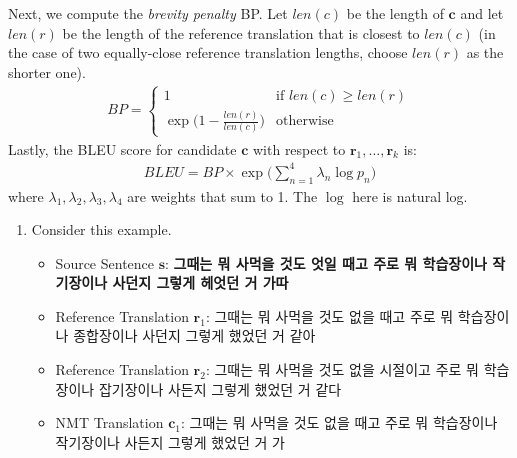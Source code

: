 \documentclass{assignment format}
\begin{document}
\begin{enumerate}[label=(\alph*)]
    Next, we compute the \textit{brevity penalty} BP. Let $len(c)$ be the length of $\mathbf{c}$ and let $len(r)$ be the length of the reference translation that is closest to $len(c)$ (in the case of two equally-close reference translation lengths, choose $len(r)$ as the shorter one). 
    \begin{align}
        BP = 
        \begin{cases}
            1 & \text{if } len(c) \ge len(r) \\
            \exp \big( 1 - \frac{len(r)}{len(c)} \big) & \text{otherwise}
        \end{cases}
    \end{align}
    Lastly, the BLEU score for candidate $\mathbf{c}$ with respect to $\mathbf{r}_1,\dots,\mathbf{r}_k$ is:
    \begin{align}
        BLEU = BP \times \exp \Big( \sum_{n=1}^4 \lambda_n \log p_n \Big)
    \end{align}
    where $\lambda_1,\lambda_2,\lambda_3,\lambda_4$ are weights that sum to 1. The $\log$ here is natural log.
    \newline
    \begin{enumerate}[label=(\roman*)]
        \item Consider this example.
        \begin{itemize}
\item        Source Sentence $\mathbf{s}$: \textbf{그때는 뭐 사먹을 것도 엇일 때고 주로 뭐 학습장이나 작기장이나 사던지 그렇게 헤엇던 거 가따} 
      \item  Reference Translation $\mathbf{r}_1$: 그때는 뭐 사먹을 것도 없을 때고 주로 뭐 학습장이나 종합장이나 사던지 그렇게 했었던 거 같아 
        \item Reference Translation $\mathbf{r}_2$: 그때는 뭐 사먹을 것도 없을 시절이고 주로 뭐 학습장이나 잡기장이나 사든지 그렇게 했었던 거 같다 
        \item NMT Translation $\mathbf{c}_1$: 그때는 뭐 사먹을 것도 없을 때고 주로 뭐 학습장이나 작기장이나 사든지 그렇게 했었던 거 가
    \end{itemize}


\end{enumerate}
\end{enumerate}
\end{document}
